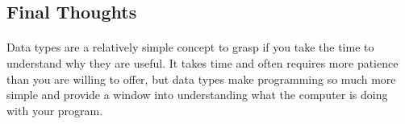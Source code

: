 \newpage

\subsection{Final Thoughts}
   \paragraph{}
      Data types are a relatively simple concept to grasp if you take the time to understand why they are useful.
      It takes time and often requires more patience than you are willing to offer, but data types make programming so much more simple
      and provide a window into understanding what the computer is doing with your program.

\newpage
